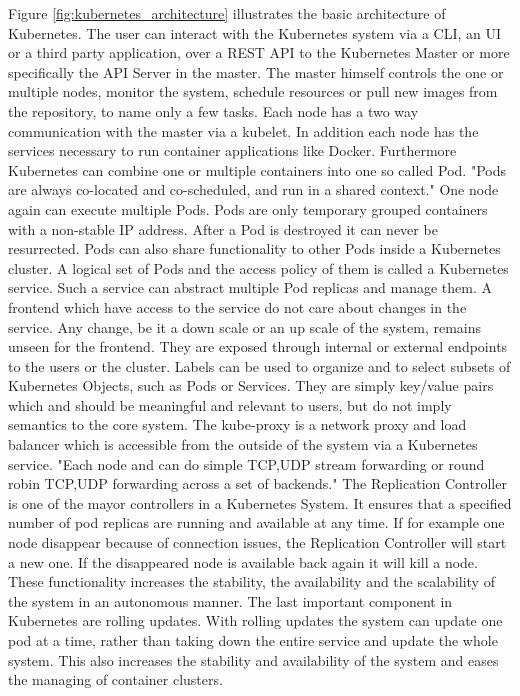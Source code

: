 Figure \ref{fig:kubernetes_architecture} illustrates the basic architecture of Kubernetes.
The user can interact with the Kubernetes system via a \ac{CLI}, an \ac{UI} or a third party application, over a \ac{REST} \ac{API} to the Kubernetes Master or more specifically the \ac{API} Server in the master.
The master himself controls the one or multiple nodes, monitor the system, schedule resources or pull new images from the repository, to name only a few tasks.
Each node has a two way communication with the master via a kubelet.
In addition each node has the services necessary to run container applications like Docker.
Furthermore Kubernetes can combine one or multiple containers into one so called Pod.\cite[cf.][p. 7]{Mulyana:2016}
"Pods are always co-located and co-scheduled, and run in a shared context."\cite{Kubernetes:pods:2016}
One node again can execute multiple Pods.
Pods are only temporary grouped containers with a non-stable \ac{IP} address.
After a Pod is destroyed it can never be resurrected.
Pods can also share functionality to other Pods inside a Kubernetes cluster.
A logical set of Pods and the access policy of them is called a Kubernetes service.
Such a service can abstract multiple Pod replicas and manage them.
A frontend which have access to the service do not care about changes in the service.
Any change, be it a down scale or an up scale of the system, remains unseen for the frontend.
They are exposed through internal or external endpoints to the users or the cluster.\cite[cf.][p. 11]{MSV:2016}
Labels can be used to organize and to select subsets of Kubernetes Objects, such as Pods or Services.\cite[cf.]{Kubernetes:labels:2016}
They are simply key/value pairs which and should be meaningful and relevant to users, but do not imply semantics to the core system.\cite[cf.]{Kubernetes:labels:2016}
The kube-proxy is a network proxy and load balancer which is accessible from the outside of the system via a Kubernetes service.\cite[cf.][p. 7]{Mulyana:2016}
"Each node and can do simple TCP,UDP stream forwarding or round robin TCP,UDP forwarding across a set of backends."\cite{Kubernetes:kube-proxy:2016}
The Replication Controller is one of the mayor controllers in a Kubernetes System.
It ensures that a specified number of pod replicas are running and available at any time.\cite[cf.]{Kubernetes:replication-controller:2016}
If for example one node disappear because of connection issues, the Replication Controller will start a new one.
If the disappeared node is available back again it will kill a node.
These functionality increases the stability, the availability and the scalability of the system in an autonomous manner.
The last important component in Kubernetes are rolling updates.
With rolling updates the system can update one pod at a time, rather than taking down the entire service and update the whole system.\cite[cf.]{Kubernetes:rolling-updates:2016}
This also increases the stability and availability of the system and eases the managing of container clusters.

